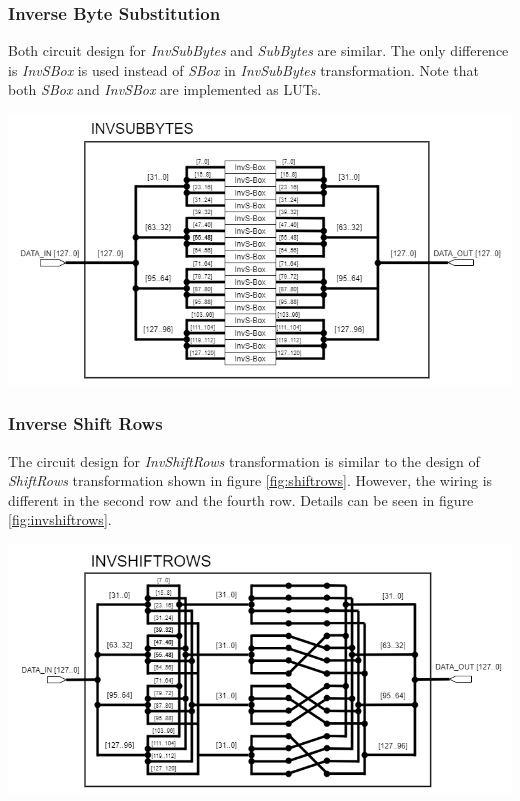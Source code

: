 \documentclass[a4paper, 10pt]{article}
\newenvironment{Figure}
    {\par\medskip\noindent\minipage{\linewidth}}
    {\endminipage\par\medskip}
\begin{document}
\begin{multicols}{2}
            \subsubsection{Inverse Byte Substitution}

	Both circuit design for \textit{InvSubBytes} and \textit{SubBytes} are similar. The only difference is \textit{InvSBox} is used instead of \textit{SBox} in \textit{InvSubBytes} transformation. Note that both \textit{SBox} and \textit{InvSBox} are implemented as LUTs.

	\noindent
            \begin{Figure}
                \centering
                \includegraphics[width=\linewidth]{InvSubBytes.png}
                \label{fig:invsubbytes}
            \end{Figure}

            \subsubsection{Inverse Shift Rows}

             The circuit design for \textit{InvShiftRows} transformation is similar to the design of \textit{ShiftRows} transformation shown in figure \ref{fig:shiftrows}. However, the wiring is different in the second row and the fourth row. Details can be seen in figure \ref{fig:invshiftrows}.

	\noindent
            \begin{Figure}
                \centering
                \includegraphics[width=\linewidth]{InvShiftRows.png}
                \label{fig:invshiftrows}
            \end{Figure}


\end{multicols}
\end{document}
